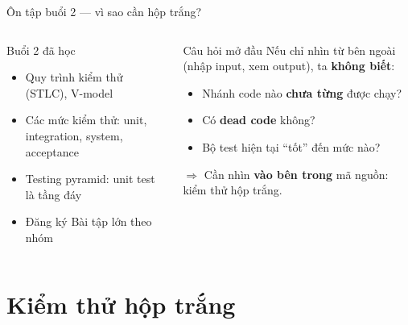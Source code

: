 \documentclass[aspectratio=169,12pt]{beamer}
\begin{document}
\begin{frame}[shrink=8]{Ôn tập buổi 2 --- vì sao cần hộp trắng?}
  \begin{columns}
    \begin{block}{Buổi 2 đã học}
      \begin{itemize}
        \item Quy trình kiểm thử (STLC), V-model
        \item Các mức kiểm thử: unit, integration, system, acceptance
        \item Testing pyramid: unit test là tầng đáy
        \item Đăng ký Bài tập lớn theo nhóm
      \end{itemize}
    \end{block}

    \begin{alertblock}{Câu hỏi mở đầu}
      Nếu chỉ nhìn từ bên ngoài (nhập input, xem output), ta \textbf{không biết}:
      \begin{itemize}
        \item Nhánh code nào \textbf{chưa từng} được chạy?
        \item Có \textbf{dead code} không?
        \item Bộ test hiện tại ``tốt'' đến mức nào?
      \end{itemize}
      $\Rightarrow$ Cần nhìn \textbf{vào bên trong} mã nguồn: kiểm thử hộp trắng.
    \end{alertblock}
  \end{columns}
\end{frame}

\section{Kiểm thử hộp trắng}
\end{document}
